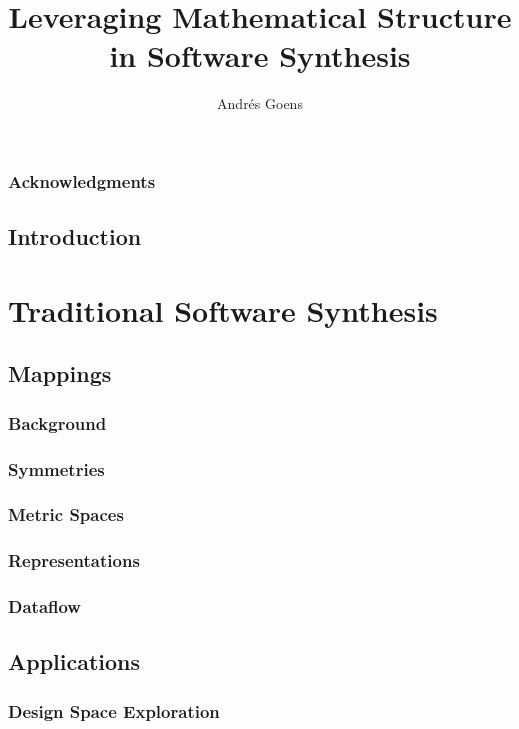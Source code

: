 \documentclass{report}
\title{Leveraging Mathematical Structure in Software Synthesis}
\author{Andr\'{e}s Goens}
\begin{document}
\date{}

\maketitle
\tableofcontents
\clearpage
\section*{Acknowledgments}


\chapter{Introduction}


\part{Traditional Software Synthesis}

\chapter{Mappings}

\section{Background}

\section{Symmetries}

\section{Metric Spaces}

\section{Representations}

\section{Dataflow}


\chapter{Applications}

\section{Design Space Exploration}

\end{document}
